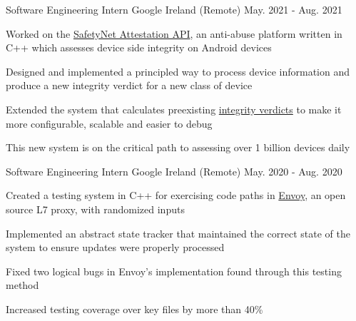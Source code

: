 \begin{cventries}
  \cventry
    {Software Engineering Intern}
    {Google}
    {Ireland (Remote)}
    {May. 2021 - Aug. 2021}
    {
      \begin{cvitems}
      \item Worked on the \href{https://developer.android.com/training/safetynet/attestation}{SafetyNet Attestation API}, an anti-abuse platform written in C++ which assesses device side integrity on Android devices
        \item Designed and implemented a principled way to process device information and produce a new integrity verdict for a new class of device
        \item Extended the system that calculates preexisting \href{https://developer.android.com/training/safetynet/attestation\#potential-integrity-verdicts}{integrity verdicts} to make it more configurable, scalable and easier to debug
        \item This new system is on the critical path to assessing over 1 billion devices daily
      \end{cvitems}
    }

  \cventry
    {Software Engineering Intern}
    {Google}
    {Ireland (Remote)}
    {May. 2020 - Aug. 2020}
    {
      \begin{cvitems}
        \item Created a testing system in C++ for exercising code paths in \href{https://github.com/envoyproxy/envoy}{Envoy}, an open source L7 proxy, with randomized inputs
        \item Implemented an abstract state tracker that maintained the correct state of the system to ensure updates were properly processed
        \item Fixed two logical bugs in Envoy's implementation found through this testing method
        \item Increased testing coverage over key files by more than 40\%
      \end{cvitems}
    }

\end{cventries}
